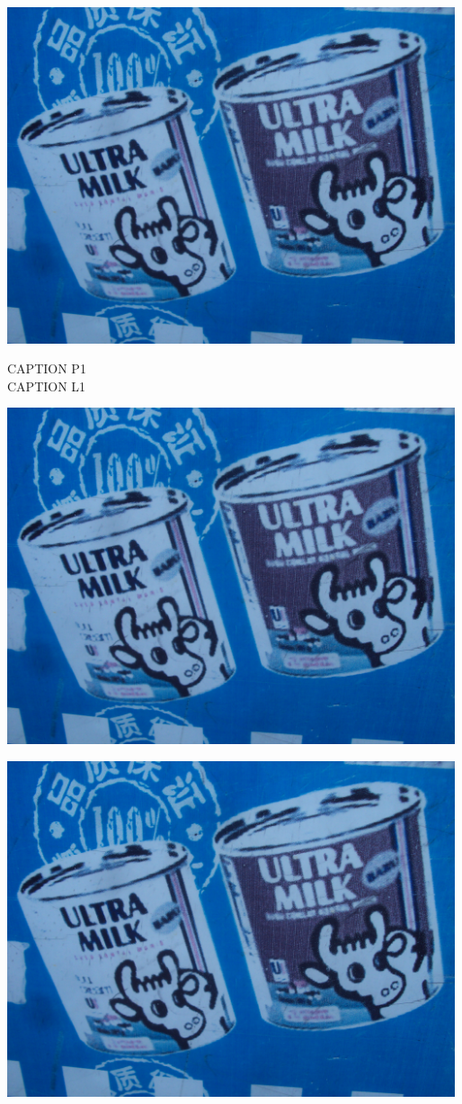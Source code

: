 \documentclass[10pt,letterpaper]{article}
\begin{document}
\vspace{0.25in}
\includegraphics[width=5.19in]{landscape.jpg}

CAPTION P1\\
CAPTION L1\\
\pagebreak

\includegraphics[width=5.19in]{landscape.jpg}

\vspace{0.25in}
\includegraphics[width=5.19in]{landscape.jpg}
\end{document}
